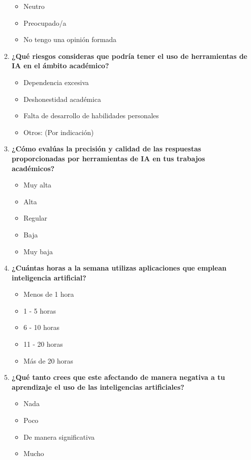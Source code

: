 \begin{multicols}{2}
\begin{enumerate}
\begin{itemize}
        \item Neutro
        \item Preocupado/a
        \item No tengo una opinión formada
      \end{itemize}
      \item \textbf{¿Qué riesgos consideras que podría tener el uso de herramientas de IA en el ámbito académico?}
      \begin{itemize}
        \item Dependencia excesiva
        \item Deshonestidad académica
        \item Falta de desarrollo de habilidades personales
        \item Otros: (Por indicación) 
      \end{itemize}
      \item \textbf{¿Cómo evalúas la precisión y calidad de las respuestas proporcionadas por herramientas de IA en tus trabajos académicos?}
      \begin{itemize}
        \item Muy alta
        \item Alta
        \item Regular
        \item Baja
        \item Muy baja
      \end{itemize}
      \item \textbf{¿Cuántas horas a la semana utilizas aplicaciones que emplean inteligencia artificial?}
      \begin{itemize}
        \item Menos de 1 hora
        \item 1 - 5 horas
        \item 6 - 10 horas
        \item 11 - 20 horas
        \item Más de 20 horas
      \end{itemize}
      \columnbreak
      \item \textbf{¿Qué tanto crees que este afectando de manera negativa a tu aprendizaje el uso de las inteligencias artificiales?}
      \begin{itemize}
        \item Nada
        \item Poco
        \item De manera significativa
        \item Mucho

\end{itemize}
\end{enumerate}
\end{multicols}
